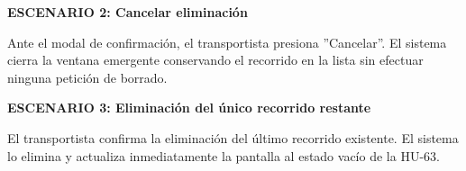 \documentclass[a4paper,9pt]{article}
\begin{document}
\begin{tcolorbox}[hucard, title={\textbf{HU-65: ELIMINAR RECORRIDO} \hfill \scriptsize \colorbox{tealstatus}{\textbf{\ Accepted\ }} \quad \colorbox{white}{\textcolor{primarydark}{\textbf{\ 1 pt\ }}}}]
{\noindent\textbf{\textcolor{secondarydark}{ESCENARIO 2:  Cancelar eliminación}}\par\vspace{1pt}
Ante el modal de confirmación, el transportista presiona ''Cancelar''. El sistema cierra la ventana emergente conservando el recorrido en la lista sin efectuar ninguna petición de borrado.\par\vspace{2.5pt}
\noindent\textbf{\textcolor{secondarydark}{ESCENARIO 3:  Eliminación del único recorrido restante}}\par\vspace{1pt}
El transportista confirma la eliminación del último recorrido existente. El sistema lo elimina y actualiza inmediatamente la pantalla al estado vacío de la HU-63.\par\vspace{2.5pt}
}\par
\end{tcolorbox}
\end{document}

